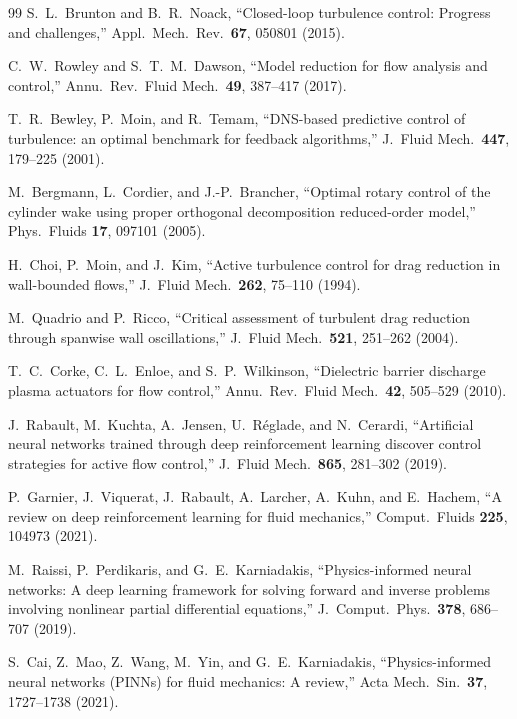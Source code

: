 \documentclass[11pt,a4paper]{article}
\begin{document}
\begin{thebibliography}{99}
S.~L.~Brunton and B.~R.~Noack,
``Closed-loop turbulence control: Progress and challenges,''
Appl.\ Mech.\ Rev.\ \textbf{67}, 050801 (2015).

C.~W.~Rowley and S.~T.~M.~Dawson,
``Model reduction for flow analysis and control,''
Annu.\ Rev.\ Fluid Mech.\ \textbf{49}, 387--417 (2017).

T.~R.~Bewley, P.~Moin, and R.~Temam,
``DNS-based predictive control of turbulence: an optimal benchmark for feedback
algorithms,'' J.\ Fluid Mech.\ \textbf{447}, 179--225 (2001).

M.~Bergmann, L.~Cordier, and J.-P.~Brancher,
``Optimal rotary control of the cylinder wake using proper orthogonal
decomposition reduced-order model,'' Phys.\ Fluids \textbf{17}, 097101 (2005).

H.~Choi, P.~Moin, and J.~Kim,
``Active turbulence control for drag reduction in wall-bounded flows,''
J.\ Fluid Mech.\ \textbf{262}, 75--110 (1994).

M.~Quadrio and P.~Ricco,
``Critical assessment of turbulent drag reduction through spanwise wall
oscillations,'' J.\ Fluid Mech.\ \textbf{521}, 251--262 (2004).

T.~C.~Corke, C.~L.~Enloe, and S.~P.~Wilkinson,
``Dielectric barrier discharge plasma actuators for flow control,''
Annu.\ Rev.\ Fluid Mech.\ \textbf{42}, 505--529 (2010).

J.~Rabault, M.~Kuchta, A.~Jensen, U.~R\'eglade, and N.~Cerardi,
``Artificial neural networks trained through deep reinforcement learning discover
control strategies for active flow control,''
J.\ Fluid Mech.\ \textbf{865}, 281--302 (2019).

P.~Garnier, J.~Viquerat, J.~Rabault, A.~Larcher, A.~Kuhn, and E.~Hachem,
``A review on deep reinforcement learning for fluid mechanics,''
Comput.\ Fluids \textbf{225}, 104973 (2021).

M.~Raissi, P.~Perdikaris, and G.~E.~Karniadakis,
``Physics-informed neural networks: A deep learning framework for solving forward
and inverse problems involving nonlinear partial differential equations,''
J.\ Comput.\ Phys.\ \textbf{378}, 686--707 (2019).

S.~Cai, Z.~Mao, Z.~Wang, M.~Yin, and G.~E.~Karniadakis,
``Physics-informed neural networks (PINNs) for fluid mechanics: A review,''
Acta Mech.\ Sin.\ \textbf{37}, 1727--1738 (2021).


\end{thebibliography}
\end{document}
